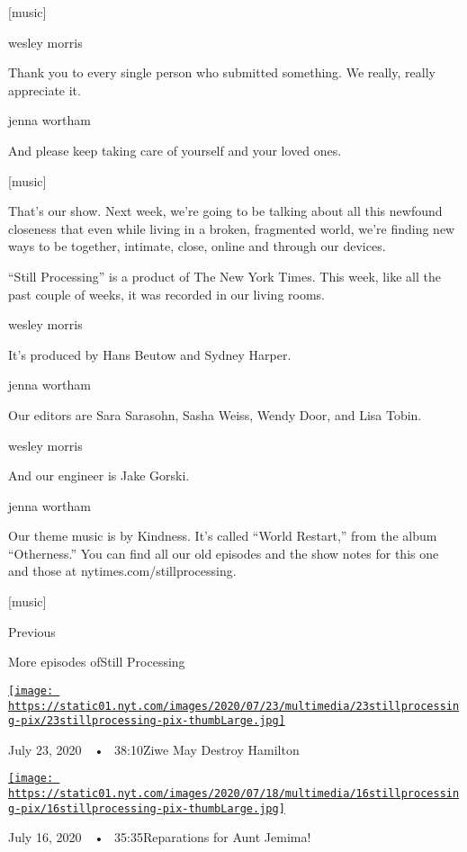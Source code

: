 {[}music{]}

wesley morris

Thank you to every single person who submitted something. We really,
really appreciate it.

jenna wortham

And please keep taking care of yourself and your loved ones.

{[}music{]}

That's our show. Next week, we're going to be talking about all this
newfound closeness that even while living in a broken, fragmented world,
we're finding new ways to be together, intimate, close, online and
through our devices.

``Still Processing'' is a product of The New York Times. This week, like
all the past couple of weeks, it was recorded in our living rooms.

wesley morris

It's produced by Hans Beutow and Sydney Harper.

jenna wortham

Our editors are Sara Sarasohn, Sasha Weiss, Wendy Door, and Lisa Tobin.

wesley morris

And our engineer is Jake Gorski.

jenna wortham

Our theme music is by Kindness. It's called ``World Restart,'' from the
album ``Otherness.'' You can find all our old episodes and the show
notes for this one and those at nytimes.com/stillprocessing.

{[}music{]}

Previous

More episodes ofStill Processing

\href{https://www.nytimes.com/2020/07/23/podcasts/hamilton-ziwe-discomfort.html?action=click\&module=audio-series-bar\&region=header\&pgtype=Article}{\texttt{[image: https://static01.nyt.com/images/2020/07/23/multimedia/23stillprocessing-pix/23stillprocessing-pix-thumbLarge.jpg]}}

July 23, 2020~~•~ 38:10Ziwe May Destroy Hamilton

\href{https://www.nytimes.com/2020/07/16/podcasts/reparations-for-aunt-jemima.html?action=click\&module=audio-series-bar\&region=header\&pgtype=Article}{\texttt{[image: https://static01.nyt.com/images/2020/07/18/multimedia/16stillprocessing-pix/16stillprocessing-pix-thumbLarge.jpg]}}

July 16, 2020~~•~ 35:35Reparations for Aunt Jemima!

